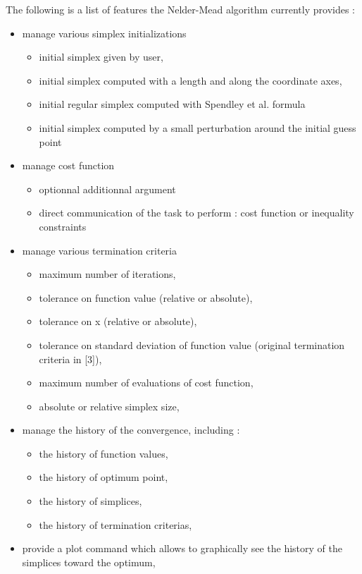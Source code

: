 The following is a list of features the Nelder-Mead algorithm currently provides :
\begin{itemize}
\item manage various simplex initializations
  \begin{itemize}
  \item initial simplex given by user,
  \item initial simplex computed with a length and along the coordinate axes,
  \item initial regular simplex computed with Spendley et al. formula
  \item initial simplex computed by a small perturbation around the initial guess point
  \end{itemize}
\item manage cost function
  \begin{itemize}
  \item optionnal additionnal argument
  \item direct communication of the task to perform : cost function or inequality constraints
  \end{itemize}
\item manage various termination criteria 
  \begin{itemize}
  \item maximum number of iterations, 
  \item tolerance on function value (relative or absolute),
  \item tolerance on x (relative or absolute),
  \item tolerance on standard deviation of function value (original termination criteria in [3]),
  \item maximum number of evaluations of cost function,
  \item absolute or relative simplex size,
  \end{itemize}
\item manage the history of the convergence, including :
  \begin{itemize}
  \item the history of function values,
  \item the history of optimum point,
  \item the history of simplices,
  \item the history of termination criterias,
  \end{itemize}
\item provide a plot command which allows to graphically see the history of the simplices toward the optimum,

\end{itemize}
